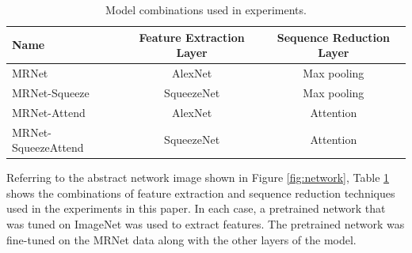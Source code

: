 \documentclass[10pt,twocolumn,letterpaper]{article}
\begin{document}









\begin{table}
\begin{center}
\begin{tabular}{|l|c|c|}
\hline
Name & Feature Extraction Layer & Sequence Reduction Layer \\
\hline
MRNet & AlexNet & Max pooling \\
MRNet-Squeeze & SqueezeNet & Max pooling \\
MRNet-Attend & AlexNet & Attention \\
MRNet-SqueezeAttend & SqueezeNet & Attention \\
\hline
\end{tabular}
\end{center}
\caption{Model combinations used in experiments.}
\label{tab:models}
\end{table}

Referring to the abstract network image shown in Figure \ref{fig:network}, Table \ref{tab:models} shows the combinations of feature extraction and sequence reduction techniques used in the experiments in this paper. In each case, a pretrained network that was tuned on ImageNet was used to extract features. The pretrained network was fine-tuned on the MRNet data along with the other layers of the model.
\end{document}
